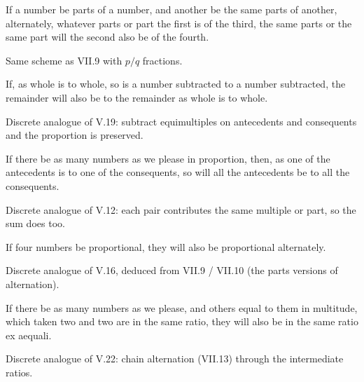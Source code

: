 \documentclass{rrxiv}
\begin{document}
\begin{claim}
\label{prop:VII.10}
If a number be parts of a number, and another be the same parts of
another, alternately, whatever parts or part the first is of the
third, the same parts or the same part will the second also be of
the fourth.
\end{claim}
\begin{evidence}
\label{ev:VII.10}
Same scheme as VII.9 with $p/q$ fractions.
\end{evidence}

\begin{claim}
\label{prop:VII.11}
If, as whole is to whole, so is a number subtracted to a number
subtracted, the remainder will also be to the remainder as whole is
to whole.
\end{claim}
\begin{evidence}
\label{ev:VII.11}
Discrete analogue of V.19: subtract equimultiples on antecedents and
consequents and the proportion is preserved.
\end{evidence}

\begin{claim}
\label{prop:VII.12}
If there be as many numbers as we please in proportion, then, as one
of the antecedents is to one of the consequents, so will all the
antecedents be to all the consequents.
\end{claim}
\begin{evidence}
\label{ev:VII.12}
Discrete analogue of V.12: each pair contributes the same multiple
or part, so the sum does too.
\end{evidence}

\begin{claim}
\label{prop:VII.13}
If four numbers be proportional, they will also be proportional
alternately.
\end{claim}
\begin{evidence}
\label{ev:VII.13}
Discrete analogue of V.16, deduced from VII.9 / VII.10 (the parts
versions of alternation).
\end{evidence}

\begin{claim}
\label{prop:VII.14}
If there be as many numbers as we please, and others equal to them
in multitude, which taken two and two are in the same ratio, they
will also be in the same ratio ex aequali.
\end{claim}
\begin{evidence}
\label{ev:VII.14}
Discrete analogue of V.22: chain alternation (VII.13) through the
intermediate ratios.
\end{evidence}
\end{document}
